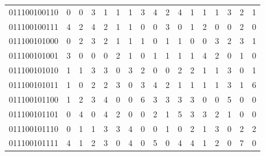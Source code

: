 \documentclass[10pt,a4paper]{article}
\begin{document}
\begin{longtable}{ |c|c|c|c|c|c|c|c|c|c|c|c|c|c|c|c|c| }
    011100100110              & 0                            & 0                                & 3                            & 1                              & 1   & 1   & 3   & 4   & 2   & 4   & 1   & 1   & 1   & 3   & 2   & 1   \\
    011100100111              & 4                            & 2                                & 4                            & 2                              & 1   & 1   & 0   & 0   & 3   & 0   & 1   & 2   & 0   & 0   & 2   & 0   \\
    011100101000              & 0                            & 2                                & 3                            & 2                              & 1   & 1   & 1   & 0   & 1   & 1   & 0   & 0   & 3   & 2   & 3   & 1   \\
    011100101001              & 3                            & 0                                & 0                            & 0                              & 2   & 1   & 0   & 1   & 1   & 1   & 1   & 4   & 2   & 0   & 1   & 0   \\
    011100101010              & 1                            & 1                                & 3                            & 3                              & 0   & 3   & 2   & 0   & 0   & 2   & 2   & 1   & 1   & 3   & 0   & 1   \\
    011100101011              & 1                            & 0                                & 2                            & 2                              & 3   & 0   & 3   & 4   & 2   & 1   & 1   & 1   & 1   & 3   & 1   & 6   \\
    011100101100              & 1                            & 2                                & 3                            & 4                              & 0   & 0   & 6   & 3   & 3   & 3   & 3   & 0   & 0   & 5   & 0   & 0   \\
    011100101101              & 0                            & 4                                & 0                            & 4                              & 2   & 0   & 0   & 2   & 1   & 5   & 3   & 3   & 2   & 1   & 0   & 0   \\
    011100101110              & 0                            & 1                                & 1                            & 3                              & 3   & 4   & 0   & 0   & 1   & 0   & 2   & 1   & 3   & 0   & 2   & 2   \\
    011100101111              & 4                            & 1                                & 2                            & 3                              & 0   & 4   & 0   & 5   & 0   & 4   & 4   & 1   & 2   & 0   & 7   & 0   \\

\end{longtable}
\end{document}
